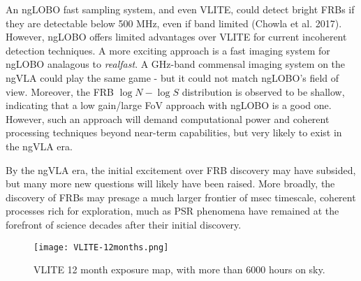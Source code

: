 \documentclass[11pt]{article}
\begin{document}
An ngLOBO fast sampling system, and even VLITE, could detect bright FRBs if they are detectable below 500 MHz, even if band limited (Chowla et al. 2017). However, ngLOBO offers limited advantages over VLITE for current incoherent detection techniques. A more exciting approach is a fast imaging system for ngLOBO analagous to {\it realfast}. A GHz-band commensal imaging system on the ngVLA could play the same game - but it could not match ngLOBO's field of view. Moreover, the FRB $\log N-\log S$ distribution is observed to be shallow, indicating that a low gain/large FoV approach with ngLOBO is a good one. However, such an approach will demand computational power and coherent processing techniques beyond near-term capabilities, but very likely to exist in the ngVLA era.







By the ngVLA era, the initial excitement over FRB discovery may have subsided, but many more new questions will likely have been raised. More broadly, the discovery of FRBs may presage a much larger frontier of msec timescale, coherent processes rich for exploration, much as PSR phenomena have remained at the forefront of science decades after their initial discovery. 

\begin{figure}[t!]
\begin{center}
\vspace{-1cm}
\texttt{[image: VLITE-12months.png]}
\end{center}
\vspace{-0.5cm}
\caption{VLITE 12 month exposure map, with more than 6000 hours on sky.
\label{v12mon}}
\end{figure}
\end{document}
